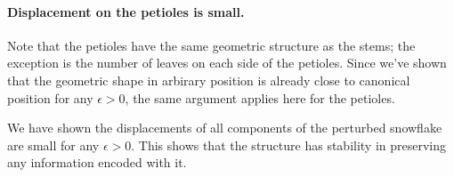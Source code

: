 
\paragraph{Displacement on the petioles is small.}
Note that the petioles have the same geometric structure as the stems; the exception is the number of leaves on each side of the petioles. 
Since we've shown that the geometric shape in arbirary position is already close to canonical position for any $\epsilon>0$, the same argument applies here for the petioles.

We have shown the displacements of all components of the perturbed snowflake are small for any $\epsilon > 0$.  
This shows that the structure has stability in preserving any information encoded with it.
